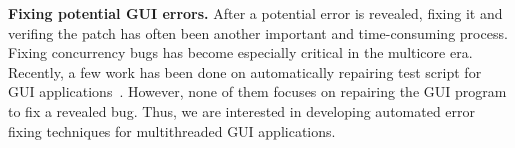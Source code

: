 \textbf{Fixing potential GUI errors.} After a potential error is revealed, fixing
it and verifing the patch has often been another important and time-consuming process. Fixing concurrency
bugs has become especially critical in the multicore era.
Recently, a few work has been done
on automatically repairing test script for GUI applications~\cite{Daniel:2011:AGR:2002931.2002937, Huang:2010:RGT:1828417.1828465}. However, none of them focuses on repairing
the GUI program to fix a revealed bug. Thus, we are interested in 
developing automated error fixing techniques for
multithreaded GUI applications.

